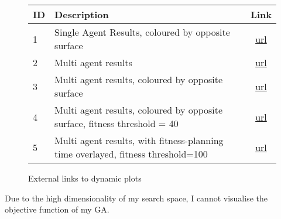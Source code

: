 
\begin{figure}[ht]
\centering
\begin{tabular}{| l | l | c |}
  \hline
  ID & Description & Link \\
  \hline
  1 & Single Agent Results, coloured by opposite surface& \href{https://barrett370.github.io/Y4-Diss/single-agent-result-1404-col}{url} \\
  2 & Multi agent results & \href{https://barrett370.github.io/Y4-Diss/multi-agent-result-1304}{url} \\
  3 & Multi agent results, coloured by opposite surface & \href{https://barrett370.github.io/Y4-Diss/multi-agent-result-1904-col}{url} \\
  4 & Multi agent results, coloured by opposite surface, fitness threshold = 40 & \href{https://barrett370.github.io/Y4-Diss/multi-agent-result-1304-lim40-col}{url} \\
  5 & Multi agent results, with fitness-planning time overlayed, fitness threshold=100 & \href{https://barrett370.github.io/Y4-Diss/multi-agent-result-shared-lim100}{url} \\


  \hline
\end{tabular}
\caption{\label{tab:plotlinks} External links to dynamic plots}
\end{figure}

Due to the high dimensionality of my search space, I cannot visualise the objective function of my GA.

